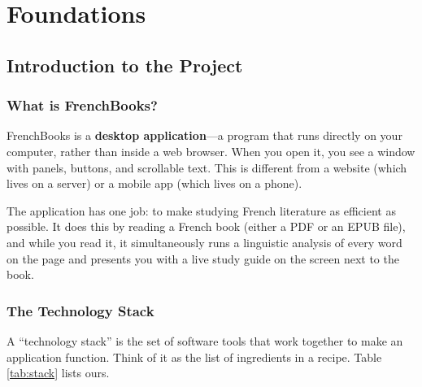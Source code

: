 \documentclass[12pt,oneside]{book}
\begin{document}
\mainmatter

\part{Foundations}

\chapter{Introduction to the Project}
\label{ch:intro}

\section{What is FrenchBooks?}

FrenchBooks is a \textbf{desktop application}—a program that runs directly on your
computer, rather than inside a web browser. When you open it, you see a window with
panels, buttons, and scrollable text. This is different from a website (which lives on a
server) or a mobile app (which lives on a phone).

The application has one job: to make studying French literature as efficient as possible.
It does this by reading a French book (either a PDF or an EPUB file), and while you read
it, it simultaneously runs a linguistic analysis of every word on the page and presents
you with a live study guide on the screen next to the book.

\section{The Technology Stack}

A ``technology stack'' is the set of software tools that work together to make an
application function. Think of it as the list of ingredients in a recipe. Table
\ref{tab:stack} lists ours.
\end{document}
